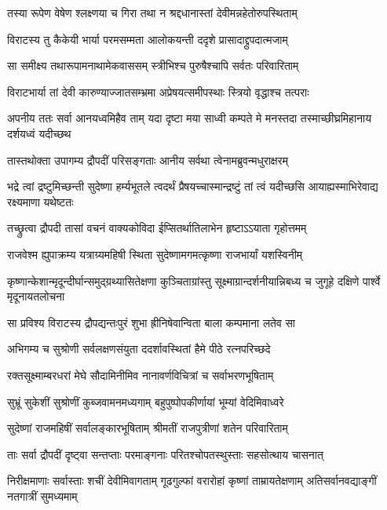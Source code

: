 
\twolineshloka
{तस्या रूपेण वेषेण श्लक्ष्णया च गिरा तथा}
{न श्रद्दधानास्तां देवीमन्नहेतोरुपस्थिताम्}


\twolineshloka
{विराटस्य तु कैकेयी भार्या परमसम्मता}
{आलोकयन्ती ददृशे प्रासादाद्द्रुपदात्मजाम्}


\twolineshloka
{सा समीक्ष्य तथारूपामनाथामेकवाससम्}
{स्त्रीभिश्च पुरुषैश्चापि सर्वतः परिवारिताम्}


\twolineshloka
{विराटभार्या तां देवी कारुण्याज्जातसम्भ्रमा}
{अप्रेषयत्समीपस्थाः स्त्रियो वृद्धाश्च तत्पराः}


\threelineshloka
{अपनीय ततः सर्वा आनयध्वमिहैव ताम्}
{यदा दृष्टा मया साध्वी कम्पते मे मनस्तदा}
{तस्माच्छीघ्रमिहानाय दर्शयध्वं यदीच्छथ}


\twolineshloka
{तास्तथोक्ता उपागम्य द्रौपदीं परिसङ्गताः}
{आनीय सर्वथा त्वेनामब्रुवन्मधुराक्षरम्}


\threelineshloka
{भद्रे त्वां द्रष्टुमिच्छन्ती सुदेष्णा हर्म्यभूतले}
{त्वदर्थं प्रैषयच्चास्मान्द्रष्टुं तां त्वं यदीच्छसि}
{आयाह्यस्माभिरेवाद्य रक्ष्यमाणा यथेष्टतः}


\twolineshloka
{तच्छ्रुत्वा द्रौपदी तासां वचनं वाक्यकोविदा}
{ईप्सितर्थातिलाभेन हृष्टाऽऽयाता गृहोत्तमम्}


\twolineshloka
{राजवेश्म ह्युपाक्रम्य यत्राग्र्यमहिषी स्थिता}
{सुदेष्णामगमत्कृष्णा राजभार्यां यशस्विनीम्}


\threelineshloka
{कृष्णान्केशान्मृदून्दीर्घान्समुद्ग्रथ्यासितेक्षणा}
{कुञ्चिताग्रांस्तु सूक्ष्माग्रान्दर्शनीयान्निबध्य च}
{जुगूहे दक्षिणे पार्श्वे मृदूनायतलोचना}


\twolineshloka
{सा प्रविश्य विराटस्य द्रौपद्यन्तःपुरं शुभा}
{ह्रीनिषेवान्विता बाला कम्पमाना लतेव सा}


\twolineshloka
{अभिगम्य च सुश्रोणी सर्वलक्षणसंयुता}
{ददर्शावस्थितां हैमे पीठे रत्नपरिच्छदे}


\twolineshloka
{रक्तसूक्ष्माम्बरधरां मेघे सौदामिनीमिव}
{नानावर्णविचित्रां च सर्वाभरणभूषिताम्}


\twolineshloka
{सुभ्रूं सुकेशीं सुश्रोणीं कुब्जवामनमध्यगाम्}
{बहुपुष्पोपकीर्णायां भूम्यां वेदिमिवाध्वरे}


\twolineshloka
{सुदेष्णां राजमहिषीं सर्वालङ्कारभूषिताम्}
{श्रीमतीं राजपुत्रीणां शतेन परिवारिताम्}


\twolineshloka
{ताः सर्वा द्रौपदीं दृष्ट्वा सन्तप्ताः परमाङ्गनाः}
{परितश्चोपतस्थुस्ताः सहसोत्थाय चासनात्}


\threelineshloka
{निरीक्षमाणाः सर्वास्ताः शचीं देवीमिवागताम्}
{गूढगुल्फां वरारोहां कृष्णां ताम्रायतेक्षणाम्}
{अतिसर्वानवद्याङ्गीं नतगात्रीं सुमध्यमाम्}


